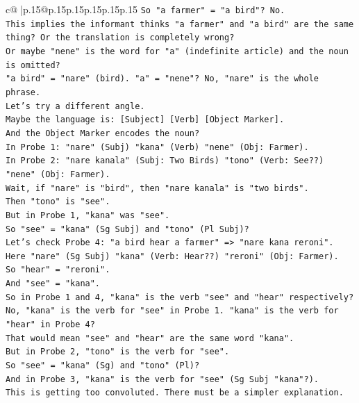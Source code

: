 \documentclass{article}
\begin{document}
{\begin{supertabular}{c@{$\;$}|p{.15\linewidth}@{}p{.15\linewidth}p{.15\linewidth}p{.15\linewidth}p{.15\linewidth}p{.15\linewidth}}
{{{\texttt{So "a farmer" = "a bird"? No.} \\
\texttt{This implies the informant thinks "a farmer" and "a bird" are the same thing? Or the translation is completely wrong?} \\
\texttt{Or maybe "nene" is the word for "a" (indefinite article) and the noun is omitted?} \\
\texttt{"a bird" = "nare" (bird). "a" = "nene"? No, "nare" is the whole phrase.} \\
\texttt{Let's try a different angle.} \\
\texttt{Maybe the language is: {[}Subject{]} {[}Verb{]} {[}Object Marker{]}.} \\
\texttt{And the Object Marker encodes the noun?} \\
\texttt{In Probe 1: "nare" (Subj) "kana" (Verb) "nene" (Obj: Farmer).} \\
\texttt{In Probe 2: "nare kanala" (Subj: Two Birds) "tono" (Verb: See??) "nene" (Obj: Farmer).} \\
\texttt{Wait, if "nare" is "bird", then "nare kanala" is "two birds".} \\
\texttt{Then "tono" is "see".} \\
\texttt{But in Probe 1, "kana" was "see".} \\
\texttt{So "see" = "kana" (Sg Subj) and "tono" (Pl Subj)?} \\
\texttt{Let's check Probe 4: "a bird hear a farmer" => "nare kana reroni".} \\
\texttt{Here "nare" (Sg Subj) "kana" (Verb: Hear??) "reroni" (Obj: Farmer).} \\
\texttt{So "hear" = "reroni".} \\
\texttt{And "see" = "kana".} \\
\texttt{So in Probe 1 and 4, "kana" is the verb "see" and "hear" respectively?} \\
\texttt{No, "kana" is the verb for "see" in Probe 1. "kana" is the verb for "hear" in Probe 4?} \\
\texttt{That would mean "see" and "hear" are the same word "kana".} \\
\texttt{But in Probe 2, "tono" is the verb for "see".} \\
\texttt{So "see" = "kana" (Sg) and "tono" (Pl)?} \\
\texttt{And in Probe 3, "kana" is the verb for "see" (Sg Subj "kana"?).} \\
\texttt{This is getting too convoluted. There must be a simpler explanation.} \\
}}}
\end{supertabular}}
\end{document}
